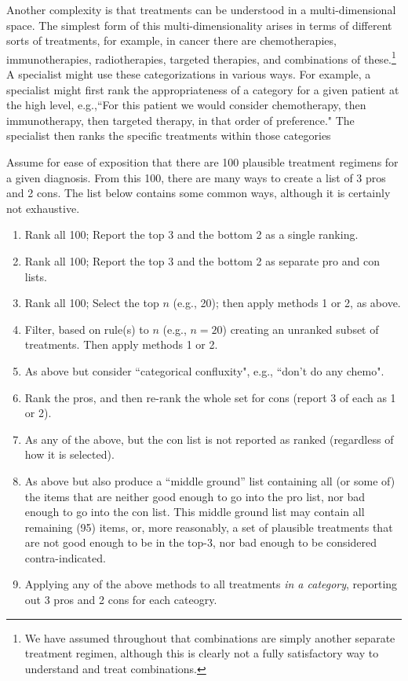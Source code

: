 \documentclass{article}
\begin{document}
Another complexity is that treatments can be understood in a multi-dimensional space. The simplest form of this multi-dimensionality arises in terms of different sorts of treatments, for example, in cancer there are chemotherapies, immunotherapies, radiotherapies, targeted therapies, and combinations of these.\footnote{We have assumed throughout that combinations are simply another separate treatment regimen, although this is clearly not a fully satisfactory way to understand and treat combinations.} A specialist might use these categorizations in various ways. For example, a specialist might first rank the appropriateness of a category for a given patient at the high level, e.g.,``For this patient we would consider chemotherapy, then immunotherapy, then targeted therapy, in that order of preference." The specialist then ranks the specific treatments within those categories

Assume for ease of exposition that there are 100 plausible treatment regimens for a given diagnosis. From this 100, there are many ways to create a list of 3 pros and 2 cons. The list below contains some common ways, although it is certainly not exhaustive.

\singlespacing
\begin{enumerate}
\item Rank all 100; Report the top 3 and the bottom 2 as a single ranking.
\item Rank all 100; Report the top 3 and the bottom 2 as separate pro and con lists.
\item Rank all 100; Select the top $n$ (e.g., 20); then apply methods 1 or 2, as above.
\item Filter, based on rule(s) to $n$ (e.g., $n=20$) creating an unranked subset of treatments. Then apply methods 1 or 2.
\item As above but consider ``categorical confluxity", e.g., ``don't do any chemo".
\item Rank the pros, and then re-rank the whole set for cons (report 3 of each as 1 or 2).
\item As any of the above, but the con list is not reported as ranked (regardless of how it is selected). 
\item As above but also produce a ``middle ground'' list containing all (or some of) the items that are neither good enough to go into the pro list, nor bad enough to go into the con list. This middle ground list may contain all remaining (95) items, or, more reasonably, a set of plausible treatments that are not good enough to be in the top-3, nor bad enough to be considered contra-indicated. 
\item Applying any of the above methods to all  treatments \emph{in a category}, reporting out 3 pros and 2 cons for each cateogry.
\end{enumerate}
\doublespacing
\end{document}
